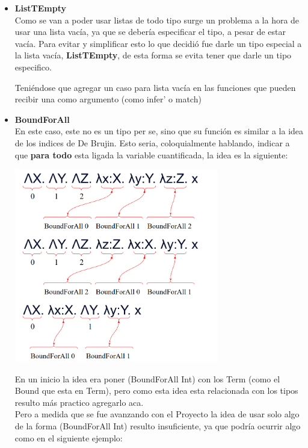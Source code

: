 \documentclass[12pt, titlepage, a4paper]{article}
\begin{document}
\begin{itemize}[label=$\bullet$]
  \item {\textbf{ListTEmpty}\\
  Como se van a poder usar listas de todo tipo surge un problema a la hora de usar una lista vacía, ya que se debería especificar el tipo, 
  a pesar de estar vacía. 
  Para evitar y simplificar esto lo que decidió fue darle un tipo especial a la lista vacía, \textbf{ListTEmpty}, de esta forma se evita 
  tener que darle un tipo especifico.
  
  Teniéndose que agregar un caso para lista vacía en las funciones que pueden recibir una como argumento (como infer' o match)
  }

  \item {\textbf{BoundForAll}\\
  En este caso, este no es un tipo per se, sino que su función es similar a la idea 
  de los indices de De Brujin. Esto seria, coloquialmente hablando, indicar a que \textbf{para todo} esta ligada la variable cuantificada, la idea es la siguiente:

  \begin{center}
      \includegraphics[width=0.7\textwidth]{Imagenes/EjemploBoundForAll.png}
  \end{center}

  En un inicio la idea era poner (BoundForAll Int) con los Term (como el Bound que esta en Term), pero como esta idea esta relacionada con 
  los tipos resulto más practico agregarlo aca.\\
  
  Pero a medida que se fue avanzando con el Proyecto la idea de usar solo algo de la forma (BoundForAll Int) resulto insuficiente, ya que podría ocurrir algo 
  como en el siguiente ejemplo:
  
}
\end{itemize}
\end{document}
